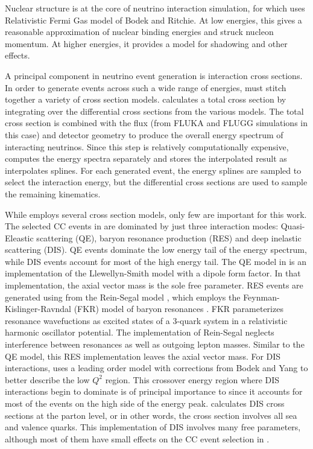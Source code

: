 Nuclear structure is at the core of neutrino interaction simulation, for which \genie uses  Relativistic Fermi Gas model of Bodek and Ritchie.  \cite{bodekritchie}  At low energies, this gives a reasonable approximation of nuclear binding energies and struck nucleon momentum.  At higher energies, it provides a model for shadowing and other effects.

A principal component in neutrino event generation is interaction cross sections.  In order to generate events across such a wide range of energies, \genie must stitch together a variety of cross section models.  \genie calculates a total cross section by integrating over the differential cross sections from the various models.  The total cross section is combined with the flux (from FLUKA and FLUGG simulations in this case) and detector geometry to produce the overall energy spectrum of interacting neutrinos.  Since this step is relatively computationally expensive, \genie computes the energy spectra separately and stores the interpolated result as interpolates splines.  For each generated event, the energy splines are sampled to select the interaction energy, but the differential cross sections are used to sample the remaining kinematics.


While \genie employs several cross section models, only few are important for this work.  The selected \numu CC events in \nova are dominated by just three interaction modes: Quasi-Eleastic scattering (QE),  baryon resonance production (RES) and deep inelastic scattering (DIS).  QE events dominate the low energy tail of the energy spectrum, while DIS events account for most of the high energy tail.  The QE model in \genie is an implementation of the Llewellyn-Smith model \cite{LlewellynSmith} with a dipole form factor.  In that implementation, the axial vector mass is the sole free parameter.  RES events are generated using from the Rein-Segal model \cite{rein1981neutrino}, which employs the Feynman-Kislinger-Ravndal (FKR) model of baryon resonances \cite{feynman1971current}.  FKR parameterizes resonance wavefuctions as excited states of a 3-quark system in a relativistic harmonic oscillator potential.  The \genie implementation of Rein-Segal neglects interference between resonances as well as outgoing lepton masses.  Similar to the QE model, this RES implementation leaves the axial vector mass.  For DIS interactions, \genie uses a leading order model with corrections from Bodek and Yang \cite{bodek2003higher} to better describe the low $Q^2$ region.  This crossover energy region where DIS interactions begin to dominate is of principal importance to \nova since it accounts for most of the events on the high side of the energy peak.  \genie calculates DIS cross sections at the parton level, or in other words, the cross section involves all sea and valence quarks.  This implementation of DIS involves many free parameters, although most of them have small effects on the \numu CC event selection in \nova.

